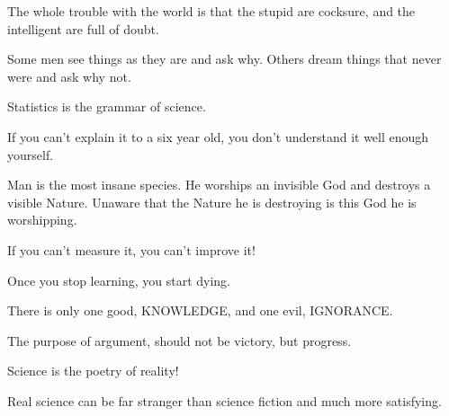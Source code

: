  	\begin{fquote}The whole trouble with the world is that the stupid are cocksure, and the intelligent are full of doubt.
 	\end{fquote}
 	
 	\begin{fquote}Some men see things as they are and ask why. Others dream things that never were and ask why not.
 	\end{fquote}
 	
 	\begin{fquote}Statistics is the grammar of science.
 	\end{fquote}
 	
 	\begin{fquote}If you can't explain it to a six year old, you don't understand it well enough yourself.
 	\end{fquote}
 	
 	\begin{fquote}Man is the most insane species. He worships an invisible God and destroys a visible Nature. Unaware that the Nature he is destroying is this God he is worshipping.
 	\end{fquote}
 	
 	\begin{fquote}If you can't measure it, you can't improve it!
 	\end{fquote}
 	
 	\begin{fquote}Once you stop learning, you start dying.
 	\end{fquote}
 	
 	\begin{fquote}[Socrates]There is only one good, KNOWLEDGE, and one evil, IGNORANCE.
 	\end{fquote}
 	
 	\begin{fquote}The purpose of argument, should not be victory, but progress.
 	\end{fquote}
 	
 	\begin{fquote}Science is the poetry of reality!
 	\end{fquote}
 	
 	\begin{fquote}Real science can be far stranger than science fiction and much more satisfying.
 	\end{fquote}
 	
